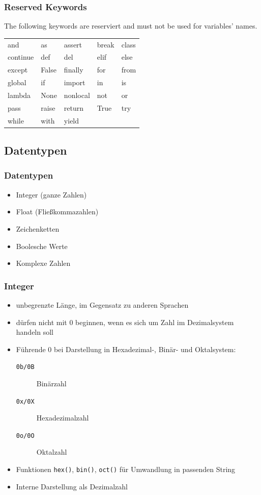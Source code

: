 \documentclass[ngerman]{beamer}
\begin{document}
\begin{frame}
\frametitle{Reserved Keywords}

The following  keywords are reserviert and must not be used for variables' names.

\begin{center}
\begin{tabular}{p{}p{}p{}p{}p{}}
and	&	as	&	assert	&	break	&	class	\\
continue	&	def	&	del	&	elif	&	else	\\
except	&	False	&	finally	&	for	&	from	\\
global	&	if	&	import	&	in	&	is	\\
lambda	&	None	&	nonlocal	&	not	&	or	\\
pass	&	raise	&	return	&	True	&	try	\\
while	&	with	&	yield	&		&		\\
\end{tabular}
\end{center}
\end{frame}



\subsection{Datentypen}

\begin{frame}
\frametitle{Datentypen}


\begin{itemize}
\item Integer (ganze Zahlen)
\item Float (Fließkommazahlen)
\item Zeichenketten
\item Boolesche Werte
\item Komplexe Zahlen
\end{itemize}
\end{frame}

\begin{frame}
\frametitle{Integer}


\begin{itemize}
\item unbegrenzte Länge, im Gegensatz zu anderen Sprachen
\item dürfen nicht mit 0 beginnen, wenn es sich um Zahl im Dezimalsystem handeln soll
\item Führende 0 bei Darstellung in Hexadezimal-, Binär- und Oktalsystem:
\begin{description}
\item[\texttt{0b/0B}] Binärzahl
\item[\texttt{0x/0X}] Hexadezimalzahl
\item[\texttt{0o/0O}] Oktalzahl 
\end{description}
\item Funktionen \texttt{hex()}, \texttt{bin()}, \texttt{oct()} für Umwandlung in passenden String
\item Interne Darstellung als Dezimalzahl
\end{itemize}
\end{frame}
\end{document}
